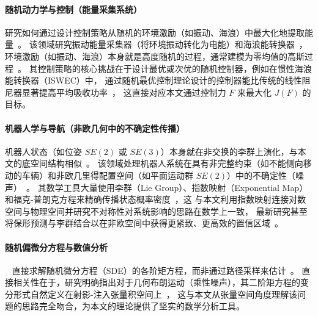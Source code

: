 ﻿\documentclass[10pt,a4paper]{article}
\begin{document}
\paragraph{随机动力学与控制（能量采集系统）}
研究如何通过设计控制策略从随机的环境激励（如振动、海浪）中最大化地提取能量~\cite{Zuo2013Energy, Ding2019Energy}。
该领域研究振动能量采集器（将环境振动转化为电能）和海浪能转换器~\cite{Falnes2002Ocean, Li2019Review}，
环境激励（如振动、海浪）本身就是高度随机的过程，通常建模为零均值的高斯过程~\cite{Rice1944Mathematical}。
其控制策略的核心挑战在于设计最优或次优的随机控制器，例如在惯性海浪能转换器（ISWEC）中，
通过随机最优控制理论设计的控制器能比传统的线性阻尼器显著提高平均吸收功率~\cite{Giorgi2020Nonlinear, Paduano2021Control}，
这直接对应本文通过控制力 $F$ 来最大化 $J(F)$ 的目标。

\paragraph{机器人学与导航（非欧几何中的不确定性传播）}
机器人状态（如位姿 $SE(2)$ 或 $SE(3)$）本身就在非交换的李群上演化，与本文的底空间结构相似~\cite{Murray1994Mathematical, Barfoot2017State}。
该领域处理机器人系统在具有非完整约束（如不能侧向移动的车辆）和非欧几里得配置空间（如平面运动群 $SE(2)$）中的不确定性（噪声）~\cite{Bloch2003Nonholonomic, Bloch2015Geometric}。
其数学工具大量使用李群（Lie Group）、指数映射（Exponential Map）和福克-普朗克方程来精确传播状态概率密度~\cite{Wang2019Lie, Solin2015Gaussian}，这
与本文利用指数映射连接对数空间与物理空间并研究不对称性对系统影响的思路在数学上一致，
最新研究甚至将保形预测与李群结合以在非欧空间中获得更紧致、更高效的置信区域~\cite{Klein2023Conformal}。

\paragraph{随机偏微分方程与数值分析}~\cite{Pardoux2007Stochastic, Hairer2011Ergodicity}
直接求解随机微分方程（SDE）的各阶矩方程，而非通过路径采样来估计~\cite{Jentzen2010Taylor, Kloeden2012Numerical}。
直接相关性在于，研究明确指出对于几何布朗运动（乘性噪声），其二阶矩方程的变分形式自然定义在射影-注入张量积空间上~\cite{Lang2017Stochastic, Flandoli2018Regularization}，
这与本文从张量空间角度理解该问题的思路完全吻合，为本文的理论提供了坚实的数学分析工具。
\end{document}
